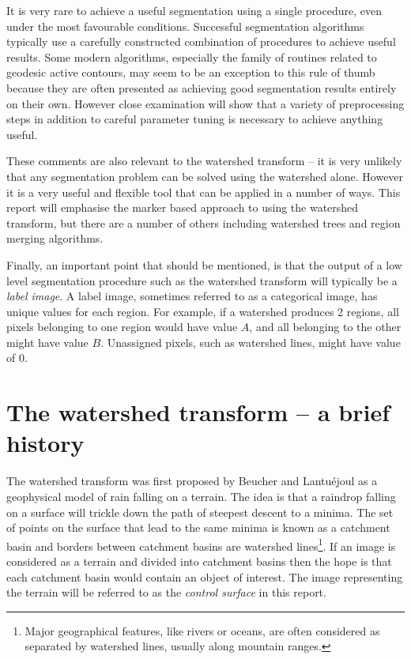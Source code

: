 \documentclass{InsightArticle}
\begin{document}
It is very rare to achieve a useful segmentation using a single
procedure, even under the most favourable conditions. Successful
segmentation algorithms typically use a carefully constructed
combination of procedures to achieve useful results. Some modern
algorithms, especially the family of routines related to geodesic
active contours, may seem to be an exception to this rule of thumb
because they are often presented as achieving good segmentation
results entirely on their own. However close examination will show
that a variety of preprocessing steps in addition to careful parameter
tuning is necessary to achieve anything useful.

These comments are also relevant to the watershed transform -- it is
very unlikely that any segmentation problem can be solved using the
watershed alone. However it is a very useful and flexible tool that
can be applied in a number of ways. This report will emphasise the
marker based approach to using the watershed transform, but there are
a number of others including watershed trees and region merging
algorithms.

Finally, an important point that should be mentioned, is that the
output of a low level segmentation procedure such as the watershed
transform will typically be a {\em label image}. A label image,
sometimes referred to as a categorical image, has unique values for
each region. For example, if a watershed produces 2 regions, all
pixels belonging to one region would have value $A$, and all belonging
to the other might have value $B$. Unassigned pixels, such as
watershed lines, might have value of $0$.

\section{The watershed transform -- a brief history}
\label{sect:history}
The watershed transform was first proposed by Beucher and
Lantu\'{e}joul\cite{Beucher-Lantu-79} as a geophysical model of rain
falling on a terrain. The idea is that a raindrop falling on a surface
will trickle down the path of steepest descent to a minima. The set of
points on the surface that lead to the same minima is known as a
catchment basin and borders between catchment basins are watershed
lines\footnote{Major geographical features, like rivers or oceans, are
often considered as separated by watershed lines, usually along
mountain ranges.}. If an image is considered as a terrain and divided
into catchment basins then the hope is that each catchment basin would
contain an object of interest. The image representing the terrain will
be referred to as the {\em control surface} in this report.
\end{document}
